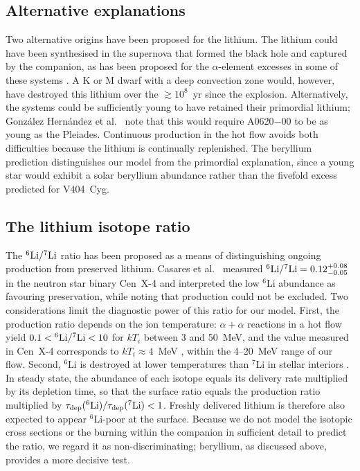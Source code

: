 \documentclass[twocolumn,showpacs,preprintnumbers,amsmath,amssymb]{revtex4}
\begin{document}
\subsection{Alternative explanations}

Two alternative origins have been proposed for the lithium. The lithium could have been synthesised in the supernova that formed the black hole and captured by the companion, as has been proposed for the $\alpha$-element excesses in some of these systems \cite{GonzalezHernandez2004,GonzalezHernandez2008}. A K or M dwarf with a deep convection zone would, however, have destroyed this lithium over the $\gtrsim 10^{8}$~yr since the explosion. Alternatively, the systems could be sufficiently young to have retained their primordial lithium; González Hernández et al.\ \cite{GonzalezHernandez2004} note that this would require A0620$-$00 to be as young as the Pleiades. Continuous production in the hot flow avoids both difficulties because the lithium is continually replenished. The beryllium prediction distinguishes our model from the primordial explanation, since a young star would exhibit a solar beryllium abundance rather than the fivefold excess predicted for V404~Cyg.

\subsection{The lithium isotope ratio}

The $^6{\rm Li}/^7{\rm Li}$ ratio has been proposed as a means of distinguishing ongoing production from preserved lithium. Casares et al.\ \cite{Casares2007} measured $^6{\rm Li}/^7{\rm Li} = 0.12^{+0.08}_{-0.05}$ in the neutron star binary Cen~X-4 and interpreted the low $^6$Li abundance as favouring preservation, while noting that production could not be excluded. Two considerations limit the diagnostic power of this ratio for our model. First, the production ratio depends on the ion temperature: $\alpha+\alpha$ reactions in a hot flow yield $0.1 < {}^6{\rm Li}/^7{\rm Li} < 10$ for $kT_i$ between 3 and 50~MeV, and the value measured in Cen~X-4 corresponds to $kT_i\approx4$~MeV \cite{Casares2007}, within the 4--20~MeV range of our flow. Second, $^6$Li is destroyed at lower temperatures than $^7$Li in stellar interiors \cite{AguileraGomez2020}. In steady state, the abundance of each isotope equals its delivery rate multiplied by its depletion time, so that the surface ratio equals the production ratio multiplied by $\tau_{\rm dep}(^6{\rm Li})/\tau_{\rm dep}(^7{\rm Li}) < 1$. Freshly delivered lithium is therefore also expected to appear $^6$Li-poor at the surface. Because we do not model the isotopic cross sections or the burning within the companion in sufficient detail to predict the ratio, we regard it as non-discriminating; beryllium, as discussed above, provides a more decisive test.
\end{document}
